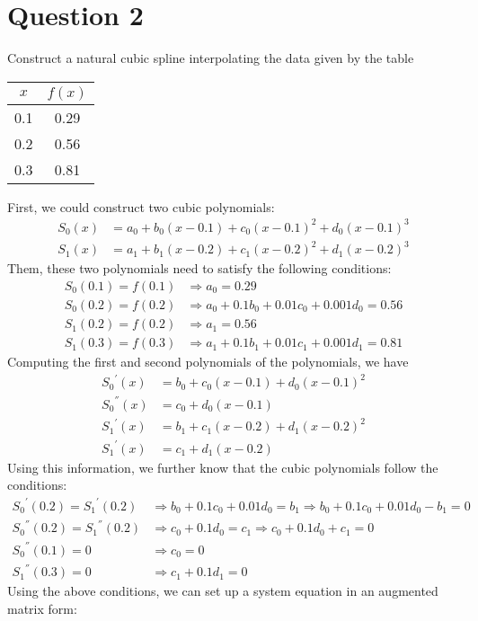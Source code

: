 \section{Question 2}

\begin{question}
    Construct a natural cubic spline interpolating the data given by the table \begin{tabular}{c|c} $x$ & $f(x)$ \\ \hline 0.1 & 0.29 \\ 0.2 & 0.56 \\ 0.3 & 0.81 \end{tabular}
\end{question}

\begin{answer}
    First, we could construct two cubic polynomials:
    \begin{align}
        S_0(x) &= a_0 + b_0(x-0.1) + c_0(x-0.1)^2 + d_0(x-0.1)^3\\
        S_1(x) &= a_1 + b_1(x-0.2) + c_1(x-0.2)^2 + d_1(x-0.2)^3
    \end{align}
    Them, these two polynomials need to satisfy the following conditions:
    \begin{align}
        S_0(0.1) = f(0.1) &\Rightarrow a_0 = 0.29\\
        S_0(0.2) = f(0.2) &\Rightarrow a_0 + 0.1b_0 + 0.01c_0 + 0.001d_0 = 0.56\\
        S_1(0.2) = f(0.2) &\Rightarrow a_1 = 0.56\\
        S_1(0.3) = f(0.3) &\Rightarrow a_1 + 0.1b_1 + 0.01c_1 + 0.001d_1 = 0.81
    \end{align}
    Computing the first and second polynomials of the polynomials, we have
    \begin{align}
        {S_0}^{'}(x) &= b_0 + c_0(x-0.1) + d_0(x-0.1)^2\\
        {S_0}^{''}(x) &= c_0 + d_0(x-0.1)\\
        {S_1}^{'}(x) &= b_1 + c_1(x-0.2) + d_1(x-0.2)^2\\
        {S_1}^{'}(x) &= c_1 + d_1(x-0.2)
    \end{align}
    Using this information, we further know that the cubic polynomials follow the conditions:
    \begin{align}
        {S_0}^{'}(0.2) = {S_1}^{'}(0.2) &\Rightarrow b_0 + 0.1c_0 + 0.01d_0 = b_1 \Rightarrow b_0 + 0.1c_0 + 0.01d_0 - b_1 = 0\\
        {S_0}^{''}(0.2) = {S_1}^{''}(0.2) &\Rightarrow c_0 + 0.1d_0 = c_1 \Rightarrow c_0 + 0.1d_0 + c_1 = 0\\
        {S_0}^{''}(0.1) = 0 &\Rightarrow c_0 = 0\\
        {S_1}^{''}(0.3) = 0 &\Rightarrow c_1 + 0.1d_1 = 0
    \end{align}
    Using the above conditions, we can set up a system equation in an augmented matrix form:
    

\end{answer}
